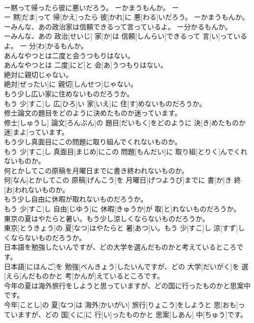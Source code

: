\documentclass[8pt]{extreport}
\begin{document}
\begin{CJK}{UTF8}{min}
\\	ー黙って帰ったら彼に悪いだろう。 ーかまうもんか。	ー
\\	ー 黙[だま]って 帰[かえ]ったら 彼[かれ]に 悪[わる]いだろう。 ーかまうもんか。
\\	ーみんな、あの政治家は信頼できるって言っているよ。 ー分かるもんか。	
\\	ーみんな、あの 政治[せいじ] 家[か]は 信頼[しんらい]できるって 言[い]っているよ。 ー 分[わ]かるもんか。
\\	あんなやつとは二度と会うつもりはない。	
\\	あんなやつとは 二度[にど]と 会[あ]うつもりはない。
\\	絶対に親切じゃない。	
\\	絶対[ぜったい]に 親切[しんせつ]じゃない。
\\	もう少し広い家に住めないものだろうか。	
\\	もう 少[すこ]し 広[ひろ]い 家[いえ]に 住[す]めないものだろうか。
\\	修士論文の題目をどのように決めたものか迷っています。	
\\	修士[しゅうし] 論文[ろんぶん]の 題目[だいもく]をどのように 決[き]めたものか 迷[まよ]っています。
\\	もう少し真面目にこの問題に取り組んでくれないものか。	
\\	もう 少[すこ]し 真面目[まじめ]にこの 問題[もんだい]に 取り組[とりく]んでくれないものか。
\\	何とかしてこの原稿を月曜日までに書き終われないものか。	
\\	何[なん]とかしてこの 原稿[げんこう]を 月曜日[げつようび]までに 書[か]き 終[お]われないものか。
\\	もう少し自由に休暇が取れないものだろうか。	
\\	もう 少[すこ]し 自由[じゆう]に 休暇[きゅうか]が 取[と]れないものだろうか。
\\	東京の夏はやたらと暑い。もう少し涼しくならないものだろうか。	
\\	東京[とうきょう]の 夏[なつ]はやたらと 暑[あつ]い。もう 少[すこ]し 涼[すず]しくならないものだろうか。
\\	日本語を勉強したいんですが、どの大学を選んだものかと考えているところです。	
\\	日本語[にほんご]を 勉強[べんきょう]したいんですが、どの 大学[だいがく]を 選[えら]んだものかと 考[かんが]えているところです。
\\	今年の夏は海外旅行をしようと思っていますが、どの国に行ったものかと思案中です。	
\\	今年[ことし]の 夏[なつ]は 海外[かいがい] 旅行[りょこう]をしようと 思[おも]っていますが、どの 国[くに]に 行[い]ったものかと 思案[しあん] 中[ちゅう]です。

\end{CJK}
\end{document}
